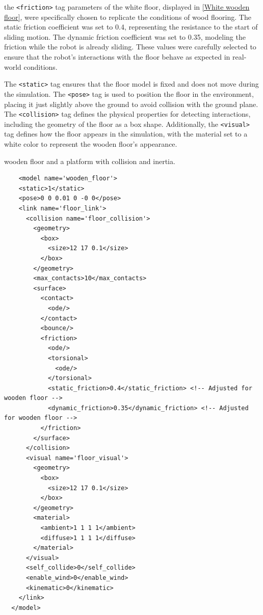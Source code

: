 \documentclass[../../main]{subfiles}
\begin{document}
    the \texttt{<friction>} tag parameters of the white floor, displayed in \cref{White wooden floor}, 
were specifically chosen to replicate the conditions of wood flooring. 
The static friction coefficient was set to 0.4, representing the 
resistance to the start of sliding motion. The dynamic friction coefficient was set 
to 0.35, modeling the friction while the robot is already sliding. These values were 
carefully selected to ensure that the robot's interactions with the floor behave as 
expected in real-world conditions.

The \texttt{<static>} tag ensures that the floor model is fixed and does not move 
during the simulation. The \texttt{<pose>} tag is used to position the floor in the 
environment, placing it just slightly above the ground to avoid collision with the 
ground plane. The \texttt{<collision>} tag defines the physical properties for 
detecting interactions, including the geometry of the floor as a box shape. 
Additionally, the \texttt{<visual>} tag defines how the floor appears in the simulation, 
with the material set to a white color to represent the wooden floor's appearance. 

\newpage
\begin{codebox}[]{wooden floor and a platform with collision and inertia.}
  
  \begin{verbatim}
    <model name='wooden_floor'>
    <static>1</static>
    <pose>0 0 0.01 0 -0 0</pose>
    <link name='floor_link'>
      <collision name='floor_collision'>
        <geometry>
          <box>
            <size>12 17 0.1</size>
          </box>
        </geometry>
        <max_contacts>10</max_contacts>
        <surface>
          <contact>
            <ode/>
          </contact>
          <bounce/>
          <friction>
            <ode/>
            <torsional>
              <ode/>
            </torsional>
            <static_friction>0.4</static_friction> <!-- Adjusted for wooden floor -->
            <dynamic_friction>0.35</dynamic_friction> <!-- Adjusted for wooden floor -->
          </friction>
        </surface>
      </collision>
      <visual name='floor_visual'>
        <geometry>
          <box>
            <size>12 17 0.1</size>
          </box>
        </geometry>
        <material>
          <ambient>1 1 1 1</ambient>
          <diffuse>1 1 1 1</diffuse>
        </material>
      </visual>
      <self_collide>0</self_collide>
      <enable_wind>0</enable_wind>
      <kinematic>0</kinematic>
    </link>
  </model>
\end{verbatim}
\end{codebox}
\end{document}
